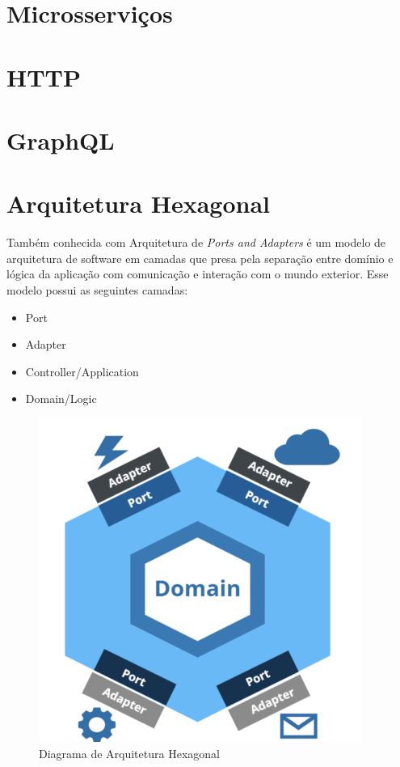 \documentclass[]{politex}
\begin{document}
	\section{Microsserviços}
	
	\section{HTTP}
	
	\section{GraphQL}
	
	\section{Arquitetura Hexagonal}
	
	Também conhecida com Arquitetura de \textit{Ports and Adapters} é um modelo de arquitetura de software em camadas que presa pela separação entre domínio e lógica da aplicação com comunicação e interação com o mundo exterior. Esse modelo possui as seguintes camadas:
	
	\begin{itemize}
	    \item Port
	    \item Adapter
	    \item Controller/Application
	    \item Domain/Logic
	\end{itemize}
	
	\begin{figure}[htbp]
	    \centering
	    \includegraphics[scale=0.6]{hexagonal1.png}
	    \caption{Diagrama de Arquitetura Hexagonal}
	    \label{fig:hexagonal1}
	\end{figure}
\end{document}
